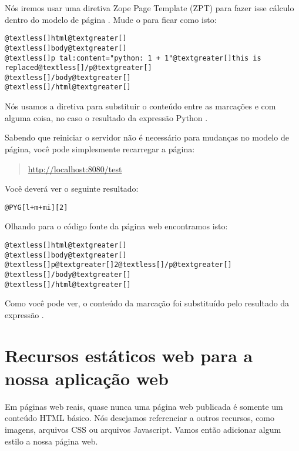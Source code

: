 \documentclass[a4paper,12pt,portuguese]{manual}
\begin{document}
Nós iremos usar uma diretiva Zope Page Template (ZPT) para fazer isse
cálculo dentro do modelo de página  . Mude o 
para ficar como isto:

\begin{Verbatim}[commandchars=@\[\]]
@textless[]html@textgreater[]
@textless[]body@textgreater[]
@textless[]p tal:content="python: 1 + 1"@textgreater[]this is replaced@textless[]/p@textgreater[]
@textless[]/body@textgreater[]
@textless[]/html@textgreater[]
\end{Verbatim}

Nós usamos a diretiva  para substituir o conteúdo entre
as marcações  e  com alguma coisa, no caso o resultado
da expressão Python .

Sabendo que reiniciar o servidor não é necessário para mudanças
no modelo de página, você pode simplesmente recarregar a página:
\begin{quote}

\href{http://localhost:8080/test}{http://localhost:8080/test}
\end{quote}

Você deverá ver o seguinte resultado:

\begin{Verbatim}[commandchars=@\[\]]
@PYG[l+m+mi][2]
\end{Verbatim}

Olhando para o código fonte da página web encontramos isto:

\begin{Verbatim}[commandchars=@\[\]]
@textless[]html@textgreater[]
@textless[]body@textgreater[]
@textless[]p@textgreater[]2@textless[]/p@textgreater[]
@textless[]/body@textgreater[]
@textless[]/html@textgreater[]
\end{Verbatim}

Como você pode ver, o conteúdo da marcação  foi substituído pelo
resultado da expressão .


\section{Recursos estáticos web para a nossa aplicação web}

Em páginas web reais, quase nunca uma página web publicada é somente
um conteúdo HTML básico. Nós desejamos referenciar a outros recursos, como
imagens, arquivos CSS ou arquivos Javascript. Vamos então
adicionar algum estilo a nossa página web.
\end{document}
